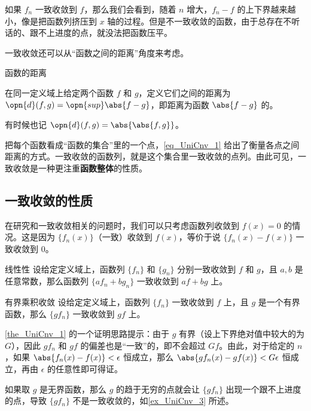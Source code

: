 如果 $f_n$ 一致收敛到 $f$，那么我们会看到，随着 $n$ 增大，$f_n-f$ 的上下界越来越小，像是把函数列挤压到 $x$ 轴的过程。但是不一致收敛的函数，由于总存在不听话的、跟不上进度的点，就没法把函数压平。

一致收敛还可以从“函数之间的距离”角度来考虑。

\begin{definition}{函数的距离}\label{def_UniCnv_1}

在同一定义域上给定两个函数 $f$ 和 $g$，定义它们之间的距离为 $\opn{d}(f, g)=\opn{sup}\abs{f-g}$，即距离为函数 $\abs{f-g}$ 的。

有时候也记 $\opn{d}(f, g)=\abs{\abs{f, g}}$。

\end{definition}

把每个函数看成“函数的集合”里的一个点，\autoref{eq_UniCnv_1} 给出了衡量各点之间距离的方式。一致收敛的函数列，就是这个集合里一致收敛的点列。由此可见，一致收敛是一种更注重\textbf{函数整体}的性质。


\subsection{一致收敛的性质}

在研究和一致收敛相关的问题时，我们可以只考虑函数列收敛到 $f(x)=0$ 的情况。这是因为 $\{f_n(x)\}$（一致）收敛到 $f(x)$，等价于说 $\{f_n(x)-f(x)\}$ 一致收敛到 $0$。

\begin{theorem}{线性性}
设给定定义域上，函数列 $\{f_n\}$ 和 $\{g_n\}$ 分别一致收敛到 $f$ 和 $g$，且 $a, b$ 是任意常数，那么函数列 $\{af_n+bg_n\}$ 一致收敛到 $af+bg$ 上。
\end{theorem}

\begin{theorem}{有界乘积收敛}\label{the_UniCnv_1}
设给定定义域上，函数列 $\{f_n\}$ 一致收敛到 $f$ 上，且 $g$ 是一个有界函数，那么 $\{gf_n\}$ 一致收敛到 $gf$ 上。
\end{theorem}

\autoref{the_UniCnv_1} 的一个证明思路提示：由于 $g$ 有界（设上下界绝对值中较大的为 $G$），因此 $gf_n$ 和 $gf$ 的偏差也是“一致”的，即不会超过 $Gf$。由此，对于给定的 $n$，如果 $\abs{f_n(x)-f(x)}<\epsilon$ 恒成立，那么 $\abs{gf_n(x)-gf(x)}<G\epsilon$ 恒成立，再由 $\epsilon$ 的任意性即可得证。

如果取 $g$ 是无界函数，那么 $g$ 的趋于无穷的点就会让 $\{gf_n\}$ 出现一个跟不上进度的点，导致 $\{gf_n\}$ 不是一致收敛的，如\autoref{ex_UniCnv_3} 所述。

